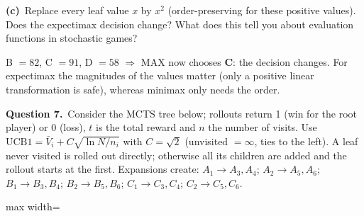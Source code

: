 \documentclass[11pt,a4paper]{article}
\newcommand{\question}[1]{\par\medskip\noindent\textbf{Question #1.}\ }
\newcommand{\subq}[1]{\par\smallskip\noindent\textbf{#1}\ }
\begin{document}
\subq{(c)}Replace every leaf value $x$ by $x^2$ (order-preserving for these positive values). Does the expectimax decision change? What does this tell you about evaluation functions in stochastic games?
\begin{solbox}
B $=82$, C $=91$, D $=58$ $\Rightarrow$ MAX now chooses \textbf{C}: the decision changes. For expectimax the magnitudes of the values matter (only a positive linear transformation is safe), whereas minimax only needs the order.
\end{solbox}
\question{7}Consider the MCTS tree below; rollouts return 1 (win for the root player) or 0 (loss), $t$ is the total reward and $n$ the number of visits. Use $\mathrm{UCB1}=\bar V_i + C\sqrt{\ln N/n_i}$ with $C=\sqrt2$ (unvisited $=\infty$, ties to the left). A leaf never visited is rolled out directly; otherwise all its children are added and the rollout starts at the first. Expansions create: $A_1\to A_3,A_4$; $A_2\to A_5,A_6$; $B_1\to B_3,B_4$; $B_2\to B_5,B_6$; $C_1\to C_3,C_4$; $C_2\to C_5,C_6$.\begin{center}
\begin{adjustbox}{max width=\linewidth}
\end{adjustbox}
\end{center}
\end{document}
